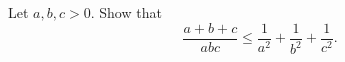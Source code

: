 Let $a, b, c > 0$. Show that
\[ \frac{a + b + c}{abc} \leq \frac{1}{a^2} + \frac{1}{b^2} + \frac{1}{c^2}. \]

